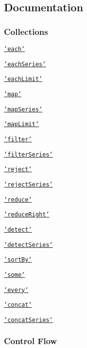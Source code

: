 \subsection*{Documentation}

\subsubsection*{Collections}


\begin{DoxyItemize}
\item \href{#each}{\tt `each`}
\item \href{#eachSeries}{\tt `each\+Series`}
\item \href{#eachLimit}{\tt `each\+Limit`}
\item \href{#map}{\tt `map`}
\item \href{#mapSeries}{\tt `map\+Series`}
\item \href{#mapLimit}{\tt `map\+Limit`}
\item \href{#filter}{\tt `filter`}
\item \href{#filterSeries}{\tt `filter\+Series`}
\item \href{#reject}{\tt `reject`}
\item \href{#rejectSeries}{\tt `reject\+Series`}
\item \href{#reduce}{\tt `reduce`}
\item \href{#reduceRight}{\tt `reduce\+Right`}
\item \href{#detect}{\tt `detect`}
\item \href{#detectSeries}{\tt `detect\+Series`}
\item \href{#sortBy}{\tt `sort\+By`}
\item \href{#some}{\tt `some`}
\item \href{#every}{\tt `every`}
\item \href{#concat}{\tt `concat`}
\item \href{#concatSeries}{\tt `concat\+Series`}
\end{DoxyItemize}

\subsubsection*{Control Flow}


